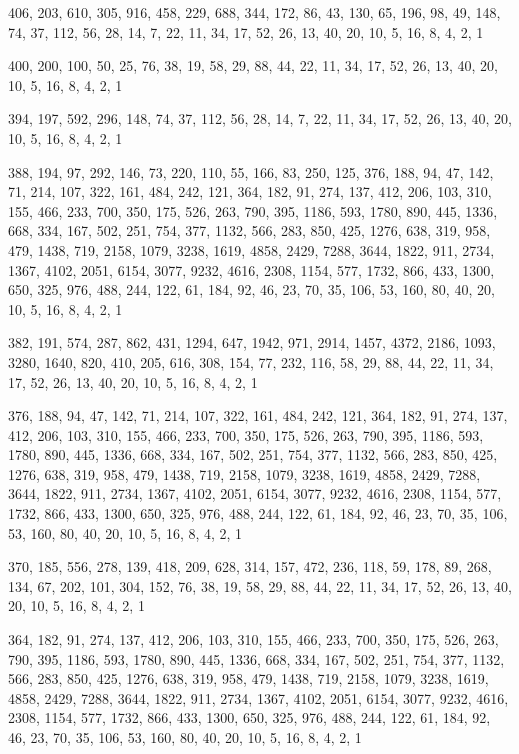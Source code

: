 \documentclass[12pt]{article}
\begin{document}
406, 203, 610, 305, 916, 458, 229, 688, 344, 172, 86, 43, 130, 65, 196, 98, 49, 148, 74, 37, 112, 56, 28, 14, 7, 22, 11, 34, 17, 52, 26, 13, 40, 20, 10, 5, 16, 8, 4, 2, 1

400, 200, 100, 50, 25, 76, 38, 19, 58, 29, 88, 44, 22, 11, 34, 17, 52, 26, 13, 40, 20, 10, 5, 16, 8, 4, 2, 1

394, 197, 592, 296, 148, 74, 37, 112, 56, 28, 14, 7, 22, 11, 34, 17, 52, 26, 13, 40, 20, 10, 5, 16, 8, 4, 2, 1

388, 194, 97, 292, 146, 73, 220, 110, 55, 166, 83, 250, 125, 376, 188, 94, 47, 142, 71, 214, 107, 322, 161, 484, 242, 121, 364, 182, 91, 274, 137, 412, 206, 103, 310, 155, 466, 233, 700, 350, 175, 526, 263, 790, 395, 1186, 593, 1780, 890, 445, 1336, 668, 334, 167, 502, 251, 754, 377, 1132, 566, 283, 850, 425, 1276, 638, 319, 958, 479, 1438, 719, 2158, 1079, 3238, 1619, 4858, 2429, 7288, 3644, 1822, 911, 2734, 1367, 4102, 2051, 6154, 3077, 9232, 4616, 2308, 1154, 577, 1732, 866, 433, 1300, 650, 325, 976, 488, 244, 122, 61, 184, 92, 46, 23, 70, 35, 106, 53, 160, 80, 40, 20, 10, 5, 16, 8, 4, 2, 1

382, 191, 574, 287, 862, 431, 1294, 647, 1942, 971, 2914, 1457, 4372, 2186, 1093, 3280, 1640, 820, 410, 205, 616, 308, 154, 77, 232, 116, 58, 29, 88, 44, 22, 11, 34, 17, 52, 26, 13, 40, 20, 10, 5, 16, 8, 4, 2, 1

376, 188, 94, 47, 142, 71, 214, 107, 322, 161, 484, 242, 121, 364, 182, 91, 274, 137, 412, 206, 103, 310, 155, 466, 233, 700, 350, 175, 526, 263, 790, 395, 1186, 593, 1780, 890, 445, 1336, 668, 334, 167, 502, 251, 754, 377, 1132, 566, 283, 850, 425, 1276, 638, 319, 958, 479, 1438, 719, 2158, 1079, 3238, 1619, 4858, 2429, 7288, 3644, 1822, 911, 2734, 1367, 4102, 2051, 6154, 3077, 9232, 4616, 2308, 1154, 577, 1732, 866, 433, 1300, 650, 325, 976, 488, 244, 122, 61, 184, 92, 46, 23, 70, 35, 106, 53, 160, 80, 40, 20, 10, 5, 16, 8, 4, 2, 1

370, 185, 556, 278, 139, 418, 209, 628, 314, 157, 472, 236, 118, 59, 178, 89, 268, 134, 67, 202, 101, 304, 152, 76, 38, 19, 58, 29, 88, 44, 22, 11, 34, 17, 52, 26, 13, 40, 20, 10, 5, 16, 8, 4, 2, 1

364, 182, 91, 274, 137, 412, 206, 103, 310, 155, 466, 233, 700, 350, 175, 526, 263, 790, 395, 1186, 593, 1780, 890, 445, 1336, 668, 334, 167, 502, 251, 754, 377, 1132, 566, 283, 850, 425, 1276, 638, 319, 958, 479, 1438, 719, 2158, 1079, 3238, 1619, 4858, 2429, 7288, 3644, 1822, 911, 2734, 1367, 4102, 2051, 6154, 3077, 9232, 4616, 2308, 1154, 577, 1732, 866, 433, 1300, 650, 325, 976, 488, 244, 122, 61, 184, 92, 46, 23, 70, 35, 106, 53, 160, 80, 40, 20, 10, 5, 16, 8, 4, 2, 1
\end{document}
